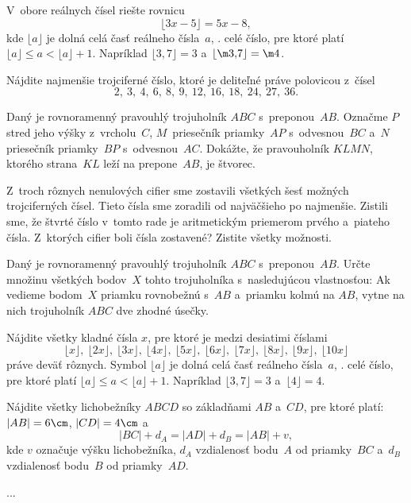 {%
V~obore reálnych čísel riešte rovnicu
$$
\lfloor3x-5\rfloor=5x-8,
$$
kde $\lfloor a\rfloor$ je dolná celá časť reálneho čísla~$a$, \tj. celé číslo,
pre ktoré platí $\lfloor a\rfloor\le a<\lfloor a\rfloor+1$. Napríklad $\lfloor3{,}7\rfloor=3$
a~$\lfloor\m3{,}7\rfloor=\m4$.}

{%
Nájdite najmenšie trojciferné číslo, ktoré je deliteľné
práve polovicou z~čísel
$$
2,\ 3,\ 4,\ 6,\ 8,\ 9,\ 12,\ 16,\ 18,\ 24,\ 27,\ 36.
$$
}

{%
Daný je rovnoramenný pravouhlý trojuholník $ABC$ s~preponou~$AB$. Označme
$P$ stred jeho výšky z~vrcholu~$C$, $M$~priesečník priamky~$AP$
s~odvesnou~$BC$ a~$N$ priesečník priamky~$BP$ s~odvesnou~$AC$.
Dokážte, že pravouholník $KLMN$, ktorého strana~$KL$ leží na
prepone~$AB$, je štvorec.}

{%
Z~troch rôznych nenulových cifier sme zostavili všetkých šesť možných
trojciferných čísel. Tieto čísla sme zoradili od najväčšieho po
najmenšie. Zistili sme, že štvrté číslo v~tomto rade je aritmetickým
priemerom prvého a~piateho čísla. Z~ktorých cifier
boli čísla zostavené? Zistite všetky možnosti.}

{%
Daný je rovnoramenný pravouhlý trojuholník $ABC$ s~preponou~$AB$.
Určte množinu všetkých bodov~$X$ tohto trojuholníka
s~nasledujúcou vlastnosťou:
Ak vedieme bodom~$X$ priamku rovnobežnú s~$AB$ a~priamku kolmú na
$AB$, vytne na nich trojuholník $ABC$ dve zhodné úsečky.}

{%
Nájdite všetky kladné čísla $x$, pre ktoré je medzi desiatimi číslami
$$
\lfloor x\rfloor,\ \lfloor2x\rfloor,\ \lfloor3x\rfloor,\ \lfloor4x\rfloor,\ \lfloor5x\rfloor,\ 
\lfloor6x\rfloor,\ \lfloor7x\rfloor,\ \lfloor8x\rfloor,\ \lfloor9x\rfloor,\ \lfloor10x\rfloor
$$
práve deväť rôznych.
Symbol $\lfloor a\rfloor$ je dolná celá časť reálneho čísla~$a$, \tj. celé číslo,
pre ktoré platí $\lfloor a\rfloor\le a<\lfloor a\rfloor+1$. Napríklad $\lfloor3{,}7\rfloor=3$ a~$\lfloor4\rfloor=4$.}
\podpis{J. Šimša}

{%
Nájdite všetky lichobežníky $ABCD$ so základňami $AB$ a~$CD$,
pre ktoré platí:
$|AB|=6\cm$, $|CD|=4\cm$
a
$$
|BC|+d_A=|AD|+d_B=|AB|+v,
$$
kde $v$ označuje výšku lichobežníka, $d_A$ vzdialenosť bodu~$A$ od
priamky~$BC$ a~$d_B$ vzdialenosť bodu~$B$ od priamky~$AD$.}

{%
...}

